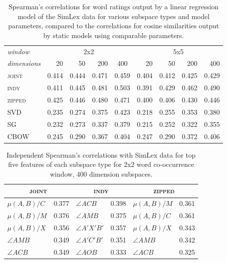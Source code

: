 \begin{table}
\centering
\begin{tabular}{lrrrr|rrrr}
\hline
\emph{window} & \multicolumn{4}{c}{2x2} & \multicolumn{4}{c}{5x5} \\
\emph{dimensions} & 20 & 50 & 200 & \multicolumn{1}{c}{400} & 20 & 50 & 200 & 400 \\
\hline
\textsc{joint} & 0.414 & 0.444 & 0.471 & 0.459 & 0.404 & 0.412 & 0.425 & 0.429 \\
\textsc{indy} & 0.411 & 0.445 & 0.481 & 0.503 & 0.391 & 0.429 & 0.462 & 0.490 \\
\textsc{zipped} & 0.425 & 0.446 & 0.480 & 0.471 & 0.400 & 0.406 & 0.430 & 0.446 \\
\textsc{SVD} & 0.235 & 0.274 & 0.375 & 0.423 & 0.218 & 0.255 & 0.353 & 0.380 \\
\textsc{SG} & 0.232 & 0.273 & 0.337 & 0.379 & 0.215 & 0.252 & 0.322 & 0.355 \\
\textsc{CBOW} & 0.245 & 0.290 & 0.367 & 0.404 & 0.247 & 0.290 & 0.372 & 0.406 \\
\hline
\end{tabular}
\caption{Spearman's correlations for word ratings output by a linear regression model of the SimLex data for various subspace types and model parameters, compared to the correlations for cosine similarities output by static models using comparable parameters.}
\label{tab:similar}
\end{table}

\begin{table}
\centering
\begin{tabular}{lr|lr|lr}
\hline
\multicolumn{2}{c}{\textsc{joint}} & \multicolumn{2}{c}{\textsc{indy}} & \multicolumn{2}{c}{\textsc{zipped}} \\
\hline
$\mu (A,B)/C$ & 0.377 & $\angle ACB$ & 0.398 & $\mu (A,B)/M$ & 0.361 \\
$\mu (A,B)/M$ & 0.376 & $\angle AMB$ & 0.375 & $\mu (A,B)/C$ & 0.361 \\
$\mu (A,B)/X$ & 0.356 & $\angle A'X'B'$ & 0.357 & $\mu (A,B)/X$ & 0.343 \\
$\angle AMB$ & 0.349 & $\angle A'C'B'$ & 0.351 & $\angle AMB$ & 0.342 \\
$\angle ACB$ & 0.349 & $\angle AOB$ & 0.333 & $\angle ACB$ & 0.325 \\
\hline
\end{tabular}
\caption{Independent Spearman's correlations with SimLex data for top five features of each subspace type for 2x2 word co-occurrence window, 400 dimension subspaces.}
\label{tab:ind-similar}
\end{table}

